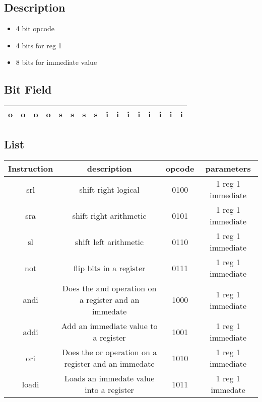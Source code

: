 \documentclass[a4paper]{article}
\begin{document}
\subsection{Description}
\begin{itemize}
\item 4 bit opcode
\item 4 bits for reg 1
\item 8 bits for immediate value
\end{itemize}

\subsection{Bit Field}
\begin{center}
\begin{tabular}{| c | c | c | c | c | c | c | c | c | c | c | c | c | c | c | c |}
\hline
o&o&o&o&s&s&s&s&i&i&i&i&i&i&i&i\\ \hline
\end{tabular}
\end{center}


\subsection{List}
\begin{center}
\begin{tabular}{| c | c | c | c |}
\hline
Instruction & description & opcode & parameters \\ \hline
srl & shift right logical & 0100 & 1 reg 1 immediate \\ \hline
sra & shift right arithmetic & 0101 & 1 reg 1 immediate \\ \hline
sl & shift left arithmetic & 0110 & 1 reg 1 immediate \\ \hline
not & flip bits in a register & 0111 & 1 reg 1 immediate \\ \hline
andi & Does the and operation on a register and an immedate & 1000 & 1 reg 1 immediate \\ \hline
addi & Add an immediate value to a register & 1001 & 1 reg 1 immediate \\ \hline
ori & Does the or operation on a register and an immedate & 1010 & 1 reg 1 immediate \\ \hline
loadi & Loads an immedate value into a register & 1011 & 1 reg 1 immedate \\ \hline
\end{tabular}
\end{center}
\end{document}
